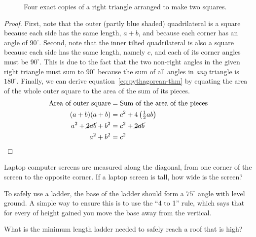 \begin{figure}[h]
  \begin{minipage}{0.5\linewidth}
    \centering
    
  \end{minipage}%
  \begin{minipage}{0.4\linewidth}
    \caption{%
      Four exact copies of a right triangle arranged to make two squares.}%
    \label{fig:pythagorean-thm}
  \end{minipage}
\end{figure}
\begin{proof}
  First, note that the outer (partly blue shaded) quadrilateral is a
  square because each side has the same length, \(a+b\), and because
  each corner has an angle of \(90^{\circ}\). Second, note that the
  inner tilted quadrilateral is also a square because each side has
  the same length, namely \(c\), and each of its corner angles must be
  \(90^{\circ}\). This is due to the fact that the two non-right
  angles in the given right triangle must sum to \(90^{\circ}\)
  because the sum of all angles in \emph{any} triangle is
  \(180^{\circ}\). Finally, we can derive
  equation~\eqref{eq:pythagorean-thm} by equating the area of the
  whole outer square to the area of the sum of its pieces.
  \begin{align*}
    \text{Area of outer square} &= \text{Sum of the area of the pieces} \\
    (a+b)(a+b) &= c^{2} +4\left( \tfrac{1}{2} a b \right) \\
    a^{2} + \cancel{2ab} + b^{2} &= c^{2} + \cancel{2ab} \\
    a^{2} + b^{2} &= c^{2}
  \end{align*}
\end{proof}

\begin{exercise}
  Laptop computer screens are measured along the diagonal, \ie{} from
  one corner of the screen to the opposite corner. If a 
  laptop screen is  tall, how wide is the screen?

\end{exercise}

\begin{exercise}
  To safely use a ladder, the base of the ladder should form a
  \(75^{\circ}\) angle with level ground. A simple way to ensure this
  is to use the ``4 to 1'' rule, which says that for every
   of height gained you move the base  away
  from the vertical.

  \bigskip

  \noindent What is the minimum length ladder needed to safely reach a
  roof that is  high?

\end{exercise}

